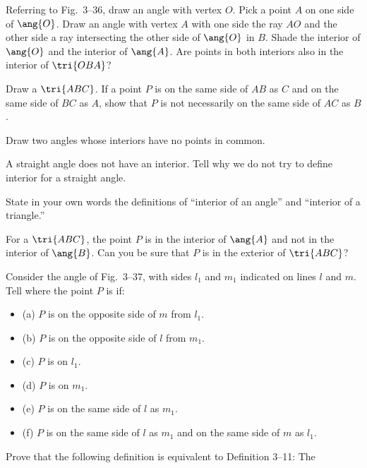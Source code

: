 \documentclass[11pt]{book}
\theoremstyle{bkplain}
\theoremstyle{XIplainnote}
\theoremstyle{bkplain}
\theoremstyle{bkplain}
\begin{document}
\begin{exercisecols}
\begin{exlist}
\item Referring to Fig.~3--36, draw an angle with vertex $O$. Pick a point $A$ on
      one side of $\ang{O}$. Draw an angle with vertex $A$ with one side the ray
      $AO$ and the other side a ray intersecting the other side of $\ang{O}$ in
      $B$. Shade the interior of $\ang{O}$ and the interior of $\ang{A}$. Are
      points in both interiors also in the interior of $\tri{OBA}$?
\exfig{\FIGIIITHIRTYSIX}
\item Draw a $\tri{ABC}$. If a point $P$ is on the same side of $AB$ as $C$ and
      on the same side of $BC$ as $A$, show that $P$ is not necessarily on the
      same side of $AC$ as $B$.
\item Draw two angles whose interiors have no points in common.
\item A straight angle does not have an interior. Tell why we do not try to
      define interior for a straight angle.
\item State in your own words the definitions of ``interior of an angle'' and
      ``interior of a triangle.''
\item For a $\tri{ABC}$, the point $P$ is in the interior of $\ang{A}$ and not in
      the interior of $\ang{B}$. Can you be sure that $P$ is in the exterior of
      $\tri{ABC}$?
\item Consider the angle of Fig.~3--37, with sides $l_1$ and $m_1$ indicated on
      lines $l$ and $m$. Tell where the point $P$ is if:
      \begin{itemize}[label=,leftmargin=1.1em,itemsep=0pt,topsep=1pt]
      \item (a) $P$ is on the opposite side of $m$ from $l_1$.
      \item (b) $P$ is on the opposite side of $l$ from $m_1$.
      \item (c) $P$ is on $l_1$.
      \item (d) $P$ is on $m_1$.
      \item (e) $P$ is on the same side of $l$ as $m_1$.
      \item (f) $P$ is on the same side of $l$ as $m_1$ and on the same side of
            $m$ as $l_1$.
      \end{itemize}
\exfig{\FIGIIITHIRTYSEVEN}
\item Prove that the following definition is equivalent to Definition 3--11: The

\end{exlist}
\end{exercisecols}
\end{document}
